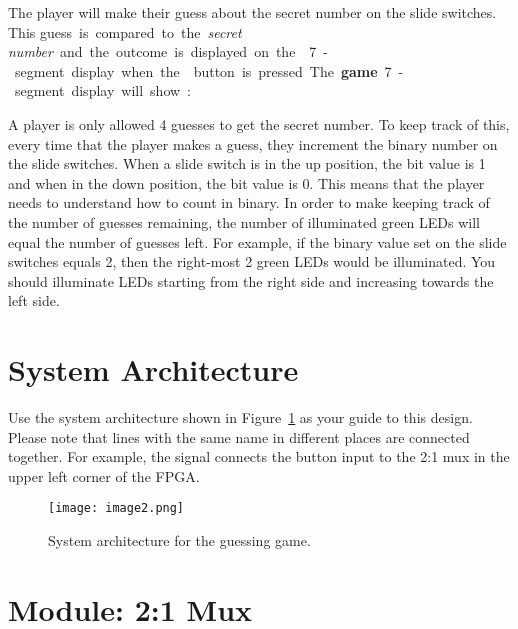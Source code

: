 The player will make their guess about the secret number on the
 slide switches. This \qty{guess} is compared to the
\emph{secret number} and the outcome is displayed on the 
7-segment display when the  button is pressed. The
\textbf{game} 7-segment display will show:


A player is only allowed 4 guesses to get the secret number. To
keep track of this, every time that the player makes a guess, they
increment the binary number on the  slide switches. When a
slide switch is in the up position, the bit value is 1 and when in the
down position, the bit value is 0. This means that the player needs to
understand how to count in binary. In order to make keeping track of the
number of guesses remaining, the number of illuminated green
 LEDs will equal the number of guesses left. For
example, if the binary value set on the  slide switches
equals 2, then the right-most 2 green LEDs would be
illuminated. You should illuminate LEDs starting from the right side and
increasing towards the left side.

\section{System Architecture}
Use the system architecture shown in Figure~\ref{fig:guessGameSysArch} as your
guide to this design. Please note that lines with the same name in different places
are connected together. For example, the signal  connects the button input to the 2:1 mux in the
upper left corner of  the FPGA.

\begin{figure}[ht]
    \texttt{[image: image2.png]}
    \caption{System architecture for the guessing game.}
    \label{fig:guessGameSysArch}
\end{figure}

\section{Module: 2:1 Mux}

